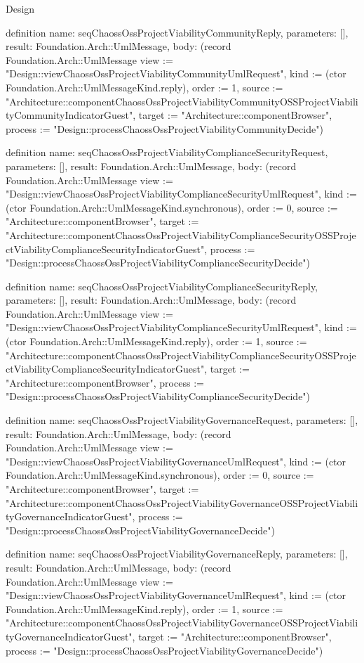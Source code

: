 \begin{lexlean}{Design}
\begin{semanticmodule}
definition{
  name: seqChaossOssProjectViabilityCommunityReply,
  parameters: [],
  result: Foundation.Arch::UmlMessage,
  body: (record Foundation.Arch::UmlMessage {view := "Design::viewChaossOssProjectViabilityCommunityUmlRequest", kind := (ctor Foundation.Arch::UmlMessageKind.reply), order := 1, source := "Architecture::componentChaossOssProjectViabilityCommunityOSSProjectViabilityCommunityIndicatorGuest", target := "Architecture::componentBrowser", process := "Design::processChaossOssProjectViabilityCommunityDecide"})
}

definition{
  name: seqChaossOssProjectViabilityComplianceSecurityRequest,
  parameters: [],
  result: Foundation.Arch::UmlMessage,
  body: (record Foundation.Arch::UmlMessage {view := "Design::viewChaossOssProjectViabilityComplianceSecurityUmlRequest", kind := (ctor Foundation.Arch::UmlMessageKind.synchronous), order := 0, source := "Architecture::componentBrowser", target := "Architecture::componentChaossOssProjectViabilityComplianceSecurityOSSProjectViabilityComplianceSecurityIndicatorGuest", process := "Design::processChaossOssProjectViabilityComplianceSecurityDecide"})
}

definition{
  name: seqChaossOssProjectViabilityComplianceSecurityReply,
  parameters: [],
  result: Foundation.Arch::UmlMessage,
  body: (record Foundation.Arch::UmlMessage {view := "Design::viewChaossOssProjectViabilityComplianceSecurityUmlRequest", kind := (ctor Foundation.Arch::UmlMessageKind.reply), order := 1, source := "Architecture::componentChaossOssProjectViabilityComplianceSecurityOSSProjectViabilityComplianceSecurityIndicatorGuest", target := "Architecture::componentBrowser", process := "Design::processChaossOssProjectViabilityComplianceSecurityDecide"})
}

definition{
  name: seqChaossOssProjectViabilityGovernanceRequest,
  parameters: [],
  result: Foundation.Arch::UmlMessage,
  body: (record Foundation.Arch::UmlMessage {view := "Design::viewChaossOssProjectViabilityGovernanceUmlRequest", kind := (ctor Foundation.Arch::UmlMessageKind.synchronous), order := 0, source := "Architecture::componentBrowser", target := "Architecture::componentChaossOssProjectViabilityGovernanceOSSProjectViabilityGovernanceIndicatorGuest", process := "Design::processChaossOssProjectViabilityGovernanceDecide"})
}

definition{
  name: seqChaossOssProjectViabilityGovernanceReply,
  parameters: [],
  result: Foundation.Arch::UmlMessage,
  body: (record Foundation.Arch::UmlMessage {view := "Design::viewChaossOssProjectViabilityGovernanceUmlRequest", kind := (ctor Foundation.Arch::UmlMessageKind.reply), order := 1, source := "Architecture::componentChaossOssProjectViabilityGovernanceOSSProjectViabilityGovernanceIndicatorGuest", target := "Architecture::componentBrowser", process := "Design::processChaossOssProjectViabilityGovernanceDecide"})
}


\end{semanticmodule}
\end{lexlean}
